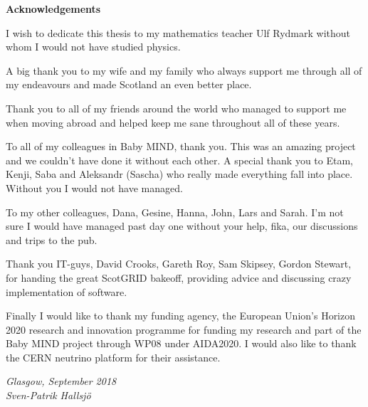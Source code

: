 \vspace*{1.75in}

\begin{center} {\bf Acknowledgements}\end{center}

I wish to dedicate this thesis to my mathematics teacher Ulf Rydmark without whom I would not have studied physics.

A big thank you to my wife and my family who always support me through all of my endeavours and made Scotland an even better place.

Thank you to all of my friends around the world who managed to support me when moving abroad and helped keep me sane throughout all of these years. 

To all of my colleagues in Baby MIND, thank you. This was an amazing project and we couldn't have done it without each other. A special thank you to Etam, Kenji, Saba and Aleksandr (Sascha) who really made everything fall into place. Without you I would not have managed.

To my other colleagues, Dana, Gesine, Hanna, John, Lars and Sarah. I'm not sure I would have managed past day one without your help, fika, our discussions and trips to the pub.

Thank you IT-guys, David Crooks, Gareth Roy, Sam Skipsey, Gordon Stewart, for handing the great ScotGRID bakeoff, providing advice and discussing crazy implementation of software.

Finally I would like to thank my funding agency, the European Union's Horizon 2020 research and innovation programme for funding my research and part of the Baby MIND project through WP08 under AIDA2020. I would also like to thank the CERN neutrino platform for their assistance.

\begin{flushright} \textit{Glasgow, September 2018 \\ Sven-Patrik Hallsj{\"o}}\end{flushright}




